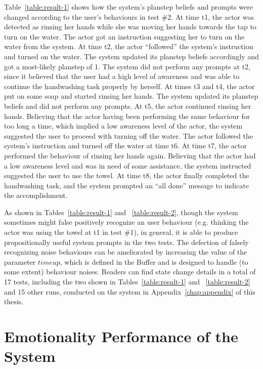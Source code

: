 Table~\ref{table:result-1} shows how the system's planstep beliefs and prompts were changed according to the user's behaviours in test \#2. At time t1, the actor was detected as rinsing her hands while she was moving her hands towards the tap to turn on the water. The actor got an instruction suggesting her to turn on the water from the system. At time t2, the actor ``followed'' the system's instruction and turned on the water. The system updated its planstep beliefs accordingly and got a most-likely planstep of 1. The system did not perform any prompts at t2, since it believed that the user had a high level of awareness and was able to continue the handwashing task properly by herself. At times t3 and t4, the actor put on some soap and started rinsing her hands. The system updated its planstep beliefs and did not perform any prompts. At t5, the actor continued rinsing her hands. Believing that the actor having been performing the same behaviour for too long a time, which implied a low awareness level of the actor, the system suggested the user to proceed with turning off the water. The actor followed the system's instruction and turned off the water at time t6. At time t7, the actor performed the behaviour of rinsing her hands again. Believing that the actor had a low awareness level and was in need of some assistance, the system instructed suggested the user to use the towel. At time t8, the actor finally completed the handwashing task, and the system prompted an ``all done'' message to indicate the accomplishment. 

As shown in Tables~\ref{table:result-1} and ~\ref{table:result-2}, though the system sometimes might false positively recognize an user behaviour (e.g. thinking the actor was using the towel at t1 in test \#1), in general, it is able to produce propositionally useful system prompts in the two tests. The defection of falsely recognizing noise behaviours can be ameliorated by increasing the value of the parameter $timeup$, which is defined in the Buffer and is designed to handle (to some extent) behaviour noises. Readers can find state change details in a total of 17 tests, including the two shown in Tables~\ref{table:result-1} and ~\ref{table:result-2} and 15 other runs, conducted on the system in Appendix~\ref{chap:appendix} of this thesis.


\section{Emotionality Performance of the System}

